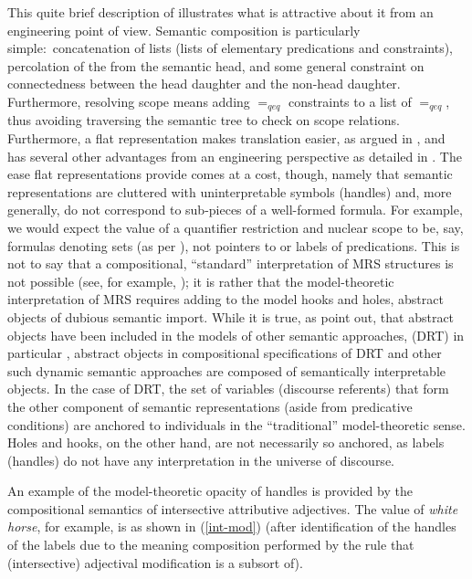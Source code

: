\documentclass[output=paper,biblatex,babelshorthands,newtxmath,draftmode,colorlinks,citecolor=brown]{langscibook}
\begin{document}
This quite brief description of  illustrates what is attractive about it from an
engineering point of view. Semantic composition is particularly simple:\ concatenation of lists
(lists of elementary predications and constraints), percolation of the  from the
semantic head, and some general constraint on connectedness between the head daughter and the
non-head daughter. Furthermore, resolving scope means adding $=_{qeq}$ constraints to a list of
$=_{qeq}$, thus avoiding traversing the semantic tree to check on scope relations. Furthermore, a
flat representation makes translation easier, as argued in \citet{Copestakeetal1995}, and has
several other advantages from an engineering perspective as detailed in \citet{Copestake2009}. The
ease flat representations provide comes at a cost, though, namely that semantic representations are
cluttered with uninterpretable symbols (handles) and, more generally, do not correspond to
sub-pieces of a well-formed formula. For example, we would expect the value of a quantifier
restriction and nuclear scope to be, say, formulas denoting sets (as per
\citealt{BarwiseandCooper1981}), not pointers to or labels of predications. This is not to say that
a compositional, ``standard'' interpretation of MRS structures is not possible (see, for example,
\citealt{Copestakeetal2001}); it is rather that the model-theoretic interpretation of MRS requires
adding to the model hooks and holes, abstract objects of dubious semantic import. While it is true,
as \citeauthor{Copestakeetal2005} point out, that abstract objects have been included in the models
of other semantic approaches,  (DRT) in particular \citep{Zeevat1989}, abstract objects in
compositional specifications of DRT and other such dynamic semantic approaches are composed of
semantically interpretable objects. In the case of DRT, the set of variables (discourse referents)
that form the other component of semantic representations (aside from predicative conditions) are
anchored to individuals in the ``traditional'' model-theoretic sense. Holes and hooks, on the other
hand, are not necessarily so anchored, as labels (handles) do not have any interpretation in the
universe of discourse.


An example of the model-theoretic opacity of handles is provided by the compositional semantics of intersective attributive adjectives. The  value of \emph{white horse}, for example, is as shown in (\ref{int-mod}) (after identification of the handles of the labels due to the meaning composition performed by the  rule that (intersective) adjectival modification is a subsort of).
\end{document}
